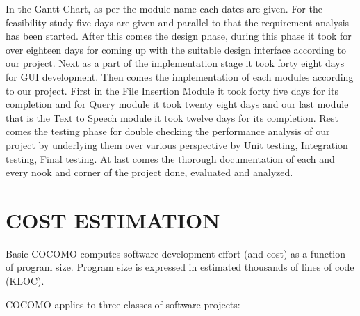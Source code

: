 \documentclass[12pt,a4paper,oneside]{report}
\begin{document}
In the Gantt Chart, as per the module name each dates are given. For the feasibility study five days are given and parallel to that the requirement analysis has been started. After this comes the design phase, during this phase it took for over eighteen days for coming up with the suitable design interface according to our project. Next as a part of the implementation stage it took forty eight days for GUI development. Then comes the implementation of each modules according to our project. First in the File Insertion Module it took forty five days for its completion and for Query module it took twenty eight days and our last module that is the Text to Speech module it took twelve days for its completion. Rest comes the testing phase for double checking the performance analysis of our project by underlying them over various perspective by Unit testing, Integration testing, Final testing. At last comes the thorough documentation of each and every nook and corner of the project done, evaluated and analyzed.

\section{COST ESTIMATION}
\par Basic COCOMO computes software development effort (and cost) as a function of program size. Program size is expressed in estimated thousands of lines of code (KLOC).\\
\par COCOMO applies to three classes of software projects:\\
\end{document}
